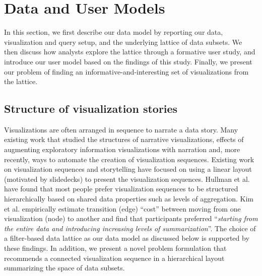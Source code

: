 \section{Data and User Models\label{sec:datamodel}} 

In this section, we first describe our data model by reporting our data, visualization and query setup, and the underlying lattice of data subsets. We then discuss how analysts explore the lattice through a formative user study, and introduce our user model based on the findings of this study. Finally, we present our problem of finding an informative-and-interesting set of visualizations from the lattice.

\subsection{Structure of visualization stories\label{sec:structure}}
\npar {} 
Visualizations are often arranged in sequence to narrate a data story. Many existing work that studied the structures of narrative visualizations\cite{Segel2010,Hullman2017}, effects of augmenting exploratory information visualizations with narration\cite{Boy2015} and, more recently, ways to automate the creation of visualization sequences\cite{Hullman2013,Kim2017}. Existing work on visualization sequences and storytelling have focused on using a linear layout (motivated by slidedecks) to present the visualization sequences. Hullman et al. \cite{Hullman2017} have found that most people prefer visualization sequences to be structured hierarchically based on shared data properties such as levels of aggregation. %
Kim et al. \cite{Kim2017} empirically estimate transition (edge) ``cost'' between moving from one visualization (node) to another and find that participants preferred ``\textit{starting from the entire data and introducing increasing levels of summarization}''. The choice of a filter-based data lattice as our data model as discussed below is supported by these findings. In addition, we present a novel problem formulation that recommends a connected visualization sequence in a hierarchical layout summarizing the space of data subsets.

